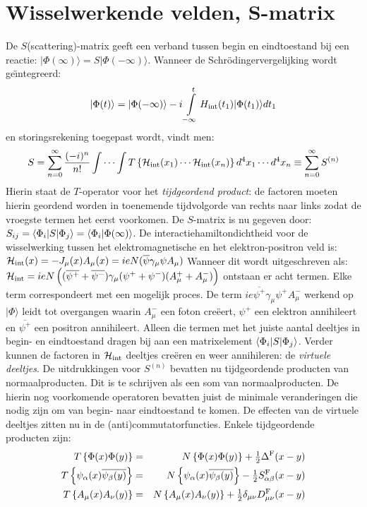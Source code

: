 \section[~~Wisselwerkende velden, S-matrix]{Wisselwerkende velden, S-matrix}
De $S$(scattering)-matrix geeft een verband tussen begin en eindtoestand bij
een reactie: $|\Phi(\infty)\rangle=S|\Phi(-\infty)\rangle$. Wanneer de
Schr\"odingervergelijking wordt ge\"{\i}ntegreerd:
\[
|\Phi(t)\rangle=|\Phi(-\infty)\rangle-i\int\limits_{-\infty}^t H_{\rm int}(t_1)|\Phi(t_1)\rangle dt_1
\]
en storingsrekening toegepast wordt, vindt men:
\[
S=\sum_{n=0}^\infty\frac{(-i)^n}{n!}\int\cdots\int
T\left\{{\cal H}_{\rm int}(x_1)\cdots{\cal H}_{\rm int}(x_n)\right\}d^4x_1\cdots d^4x_n
\equiv\sum_{n=0}^\infty S^{(n)}
\]
Hierin staat de $T$-operator voor het {\it tijdgeordend product}: de factoren
moeten hierin geordend worden in toenemende tijdvolgorde van rechts naar links
zodat de vroegste termen het eerst voorkomen. De $S$-matrix is nu gegeven door:
$S_{ij}=\left\langle \Phi_i|S|\Phi_j \right\rangle=\left\langle \Phi_i|\Phi(\infty) \right\rangle$.
\npar
De interactiehamiltondichtheid voor de wisselwerking tussen het
elektromagnetische en het elektron-positron veld is:
${\cal H}_{\rm int}(x)=-J_\mu(x)A_\mu(x)=ieN(\overline{\psi}\gamma_\mu\psi A_\mu)$
\npar
Wanneer dit wordt uitgeschreven als:
${\cal H}_{\rm int}=ieN\left((\overline{\psi^+}+\overline{\psi^-})\gamma_\mu(\psi^++\psi^-)(A_\mu^++A_\mu^-)\right)$
\npar
ontstaan er acht termen. Elke term correspondeert met een mogelijk proces. De
term $ie\overline{\psi^+}\gamma_\mu\psi^+A_\mu^-$ werkend op $|\Phi\rangle$
leidt tot overgangen waarin $A_\mu^-$ een foton cre\"eert, $\psi^+$ een
elektron annihileert en $\overline{\psi^+}$ een positron annihileert.
Alleen die termen met het juiste aantal deeltjes in begin- en eindtoestand
dragen bij aan een matrixelement $\left\langle \Phi_i|S|\Phi_j \right\rangle$. Verder kunnen de
factoren in ${\cal H}_{\rm int}$ deeltjes cre\"eren en weer annihileren:
de {\it virtuele deeltjes}.
\npar
De uitdrukkingen voor $S^{(n)}$ bevatten nu tijdgeordende producten van
normaalproducten. Dit is te schrijven als een som van normaalproducten.
De hierin nog voorkomende operatoren bevatten juist de minimale veranderingen
die nodig zijn om van begin- naar eindtoestand te komen. De effecten van de
virtuele deeltjes zitten nu in de (anti)commutatorfuncties. Enkele
tijdgeordende producten zijn:
\begin{eqnarray*}
T\left\{\Phi(x)\Phi(y)\right\}&=&N\left\{\Phi(x)\Phi(y)\right\}+\mbox{$\frac{1}{2}$}\Delta^{\rm F}(x-y)\\
T\left\{\psi_\alpha(x)\overline{\psi_\beta(y)}\right\}&=&N\left\{\psi_\alpha(x)\overline{\psi_\beta(y)}\right\}-\mbox{$\frac{1}{2}$} S_{\alpha\beta}^{\rm F}(x-y)\\
T\left\{A_\mu(x)A_\nu(y)\right\}&=&N\left\{A_\mu(x)A_\nu(y)\right\}+\mbox{$\frac{1}{2}$}\delta_{\mu\nu}D_{\mu\nu}^{\rm F}(x-y)
\end{eqnarray*}

